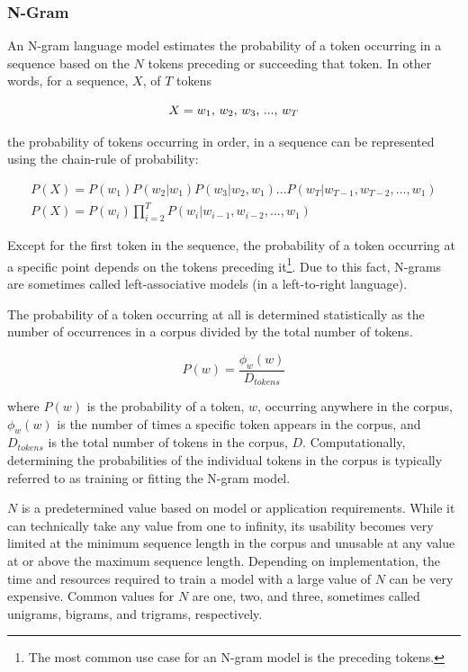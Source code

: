 \documentclass[12pt]{article}
\begin{document}
\subsubsection{N-Gram}\label{sec:ngram}
An N-gram language model estimates the probability of a token occurring in a sequence based on the $N$ tokens preceding or succeeding that token.
In other words, for a sequence, $X$, of $T$ tokens

\begin{equation}\label{eq:ngram_sequence}
    X = \mbox{$w_1$, $w_2$, $w_3$, ..., $w_T$}\\
\end{equation}

\noindent
the probability of tokens occurring in order, in a sequence can be represented using the chain-rule of probability:

\begin{equation}
    \begin{gathered}
        P(X) = P(w_1) P(w_2|w_1) P(w_3|w_2, w_1) ... P(w_T|w_{T-1}, w_{T-2}, ..., w_1)\\
        P(X) = P(w_i)\prod_{i=2}^{T} P(w_i|w_{i-1}, w_{i-2}, ..., w_1)
    \end{gathered}
\end{equation}

\noindent
Except for the first token in the sequence, the probability of a token occurring at a specific point depends on the tokens preceding
it\footnote{The most common use case for an N-gram model is the preceding tokens.}. Due to this fact, N-grams are sometimes called left-associative
models (in a left-to-right language).

The probability of a token occurring at all is determined statistically as the number of occurrences in a corpus divided by the total number of tokens.

\begin{equation}\label{eq:ngram_prob_wj}
    P(w) = \frac{\phi_w(w)}{D_{tokens}}
\end{equation}

\noindent
where $P(w)$ is the probability of a token, $w$, occurring anywhere in the corpus, $\phi_w(w)$ is the number of times a specific token appears in the
corpus, and $D_{tokens}$ is the total number of tokens in the corpus, $D$. Computationally, determining the probabilities of the individual tokens in
the corpus is typically referred to as training or fitting the N-gram model.

$N$ is a predetermined value based on model or application requirements. While it can technically take any value from one to infinity, its usability
becomes very limited at the minimum sequence length in the corpus and unusable at any value at or above the maximum sequence length. Depending on
implementation, the time and resources required to train a model with a large value of $N$ can be very expensive. Common values for $N$ are one, two,
and three, sometimes called unigrams, bigrams, and trigrams, respectively.
\end{document}
